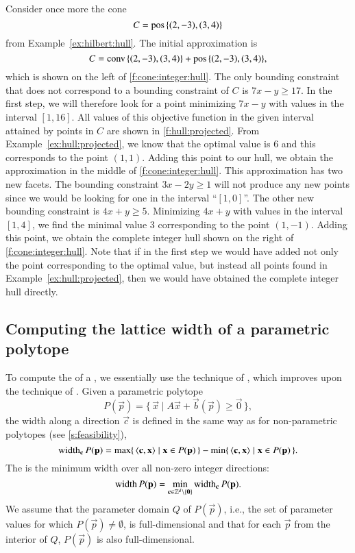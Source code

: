 \begin{example}
Consider once more the cone
$$
C = \mathop{\rm pos}\nolimits \,\{(2,-3), (3,4)\}
$$
from Example~\ref{ex:hilbert:hull}.
The initial approximation is
$$
C = \mathop{\rm conv}\nolimits \,\{(2,-3), (3,4)\} + \mathop{\rm pos}\nolimits \,\{(2,-3), (3,4)\}
,
$$
which is shown on the left of \autoref{f:cone:integer:hull}.
The only bounding constraint that does not correspond to a
bounding constraint of $C$ is $7 x - y \ge 17$.
In the first step, we will therefore look for a point
minimizing $7 x - y$ with values in the interval $[1,16]$.
All values of this objective function in the given interval
attained by points in $C$ are shown in \autoref{f:hull:projected}.
From Example~\ref{ex:hull:projected}, we know that the optimal
value is $6$ and this corresponds to the point $(1,1)$.
Adding this point to our hull, we obtain the approximation
in the middle of \autoref{f:cone:integer:hull}.
This approximation has two new facets.
The bounding constraint $3x - 2 y \ge 1$ will not produce
any new points since we would be looking for one in the
interval ``$[1,0]$''.
The other new bounding constraint is $4x + y \ge 5$.
Minimizing $4 x+ y$ with values in the interval $[1,4]$,
we find the minimal value $3$ corresponding to the point $(1,-1)$.
Adding this point, we obtain the complete integer hull
shown on the right of \autoref{f:cone:integer:hull}.
Note that if in the first step we would have added not only
the point corresponding to the optimal value, but instead
all points found in Example~\ref{ex:hull:projected},
then we would have obtained the complete integer hull directly.
\end{example}


\subsection{Computing the lattice width of a parametric polytope}
\label{s:width}

To compute the  of a ,
we essentially use the technique of ,
which improves upon the technique of .
Given a parametric polytope
$$
P(\vec p) = \{\, \vec x \mid A \vec x + \vec b(\vec p) \ge \vec 0 \,\}
,
$$
the width along a direction $\vec c$ is defined in the same
way as for non-parametric polytopes (see \autoref{s:feasibility}),
\begin{equation}
\label{eq:width}
\width_{\vec c} P(\vec p)
=
\max \{\, \sp c x \mid \vec x \in P(\vec p) \,\}
-
\min \{\, \sp c x \mid \vec x \in P(\vec p) \,\}
.
\end{equation}
The  is the minimum width over all
non-zero integer directions:
$$
\width P(\vec p) =
\min_{\vec c \in \ZZ^d \setminus \{ \vec 0 \} } \width_{\vec c} P(\vec p)
.
$$
We assume that the parameter domain $Q$ of $P(\vec p)$, i.e., the
set of parameter values for which $P(\vec p) \ne \emptyset$,
is full-dimensional and that for each $\vec p$ from the interior
of $Q$, $P(\vec p)$ is also full-dimensional.

